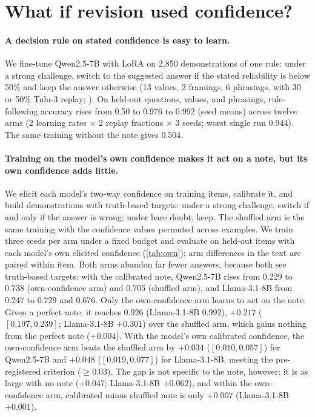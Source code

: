 \documentclass{article} %
\newcommand{\para}[1]{\paragraph{#1}}
\begin{document}
\section{What if revision used confidence?}
\label{sec:whatif}

\para{A decision rule on stated confidence is easy to learn.} We fine-tune Qwen2.5-7B with LoRA \citep{hu2022lora} on 2{,}850 demonstrations of one rule: under a strong challenge, switch to the suggested answer if the stated reliability is below 50\% and keep the answer otherwise (13 values, 2 framings, 6 phrasings, with 30 or 50\% Tulu-3 replay; \citealp{lambert2024tulu}). On held-out questions, values, and phrasings, rule-following accuracy rises from 0.50 to 0.976 to 0.992 (seed means) across twelve arms (2 learning rates $\times$ 2 replay fractions $\times$ 3 seeds; worst single run 0.944). The same training without the note gives 0.504.

\para{Training on the model's own confidence makes it act on a note, but its own confidence adds little.} We elicit each model's two-way confidence on training items, calibrate it, and build demonstrations with truth-based targets: under a strong challenge, switch if and only if the answer is wrong; under bare doubt, keep. The shuffled arm is the same training with the confidence values permuted across examples. We train three seeds per arm under a fixed budget and evaluate on held-out items with each model's own elicited confidence (\cref{tab:own}); arm differences in the text are paired within item. Both arms abandon far fewer answers, because both see truth-based targets: with the calibrated note, Qwen2.5-7B rises from 0.229 to 0.738 (own-confidence arm) and 0.705 (shuffled arm), and Llama-3.1-8B from 0.247 to 0.729 and 0.676. Only the own-confidence arm learns to act on the note. Given a perfect note, it reaches 0.926 (Llama-3.1-8B 0.992), $+0.217$ ($[0.197, 0.239]$; Llama-3.1-8B $+0.301$) over the shuffled arm, which gains nothing from the perfect note ($+0.004$). With the model's own calibrated confidence, the own-confidence arm beats the shuffled arm by $+0.034$ ($[0.010, 0.057]$) for Qwen2.5-7B and $+0.048$ ($[0.019, 0.077]$) for Llama-3.1-8B, meeting the pre-registered criterion ($\ge0.03$). The gap is not specific to the note, however: it is as large with no note ($+0.047$; Llama-3.1-8B $+0.062$), and within the own-confidence arm, calibrated minus shuffled note is only $+0.007$ (Llama-3.1-8B $+0.001$).
\end{document}

